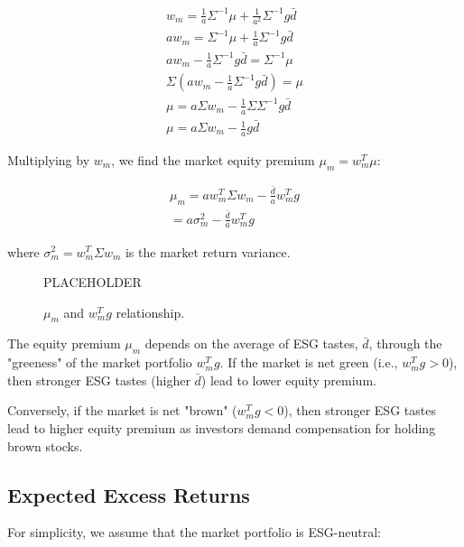 \begin{equation}
    \begin{aligned}
    w_m = \frac{1}{a} \Sigma^{-1} \mu + \frac{1}{a^2} \Sigma^{-1} g \bar{d} \\
    a w_m = \Sigma^{-1} \mu + \frac{1}{a} \Sigma^{-1} g \bar{d} \\
    a w_m - \frac{1}{a} \Sigma^{-1} g \bar{d} = \Sigma^{-1} \mu \\
    \Sigma (a w_m - \frac{1}{a} \Sigma^{-1} g \bar{d}) = \mu \\ 
    \mu = a \Sigma w_m - \frac{1}{a} \Sigma \Sigma^{-1} g \bar{d} \\
    \mu = a \Sigma w_m - \frac{1}{a} g \bar{d}
    \end{aligned}
\end{equation}

Multiplying by $w_m$, we find the market equity premium $\mu_m = w_m^T \mu$:

\begin{equation}
    \begin{aligned}
    \mu_m = a w_m^T \Sigma w_m - \frac{\bar{d}}{a} w_m^T g  \\
    = a \sigma_m^2 - \frac{\bar{d}}{a} w_m^T g 
    \end{aligned}
\end{equation}

where $\sigma_m^2 = w_m^T \Sigma w_m$ is the market return variance. 

\begin{figure}
    \centering
    PLACEHOLDER
    \caption{$\mu_m$ and $w_m^Tg$ relationship.}
    \label{fig:green_market}
\end{figure}

The equity premium $\mu_m$ depends on the average of ESG tastes, $\bar{d}$,
through the "greeness" of the market portfolio $w_m^T g$.
If the market is net green (i.e., $w_m^T g > 0$), then stronger 
ESG tastes (higher $\bar{d}$) lead to lower equity premium.

Conversely, if the market is net "brown" ($w_m^T g < 0$), then stronger
ESG tastes lead to higher equity premium as investors demand 
compensation for holding brown stocks.


\subsection{Expected Excess Returns}


For simplicity, we assume that the market portfolio is ESG-neutral:

